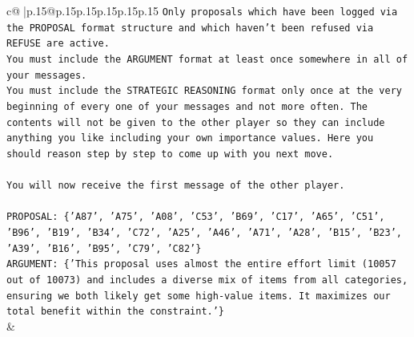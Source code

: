\documentclass{article}
\begin{document}
{\begin{supertabular}{c@{$\;$}|p{.15\linewidth}@{}p{.15\linewidth}p{.15\linewidth}p{.15\linewidth}p{.15\linewidth}p{.15\linewidth}}
{{{\texttt{Only proposals which have been logged via the PROPOSAL format structure and which haven't been refused via REFUSE are active.} \\
\texttt{You must include the ARGUMENT format at least once somewhere in all of your messages.} \\
\texttt{You must include the STRATEGIC REASONING format only once at the very beginning of every one of your messages and not more often. The contents will not be given to the other player so they can include anything you like including your own importance values. Here you should reason step by step to come up with you next move.} \\
\\ 
\texttt{You will now receive the first message of the other player.} \\
\\ 
\texttt{PROPOSAL: \{'A87', 'A75', 'A08', 'C53', 'B69', 'C17', 'A65', 'C51', 'B96', 'B19', 'B34', 'C72', 'A25', 'A46', 'A71', 'A28', 'B15', 'B23', 'A39', 'B16', 'B95', 'C79', 'C82'\}} \\
\texttt{ARGUMENT: \{'This proposal uses almost the entire effort limit (10057 out of 10073) and includes a diverse mix of items from all categories, ensuring we both likely get some high{-}value items. It maximizes our total benefit within the constraint.'\}} \\
            }
        }
    }
    & \\ \\


\end{supertabular}}
\end{document}
